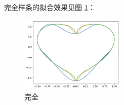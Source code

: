 \documentclass{ctexart}
\begin{document}
完全样条的拟合效果见图 \ref{e3}：

\begin{figure}[htbp]
\centering
\begin{minipage}{5cm}
    \centering
    \includegraphics[width=5cm]{e3.png}
    \caption{完全}
    \label{e3}
\end{minipage}
\end{figure}
\end{document}
